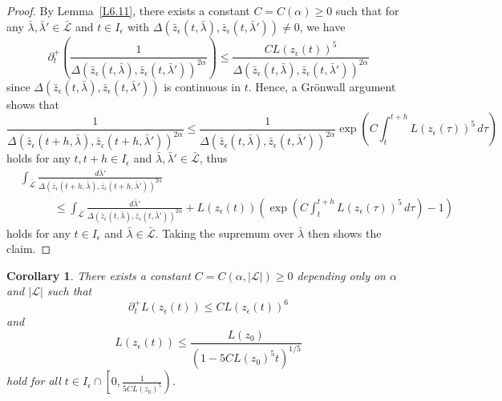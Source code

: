\documentclass[reqno,centertags,12pt]{amsart}
\newtheorem{corollary}[theorem]{Corollary}
\theoremstyle{definition}
\numberwithin{equation}{section}
\newcommand{\abs}[1]{\left\lvert#1\right\rvert}
\begin{document}
\begin{proof}
    By Lemma~\ref{L6.11}, there exists a constant
    $C=C(\alpha)\geq 0$ such that for any
    $\bar{\lambda},\bar{\lambda}'\in\bar{\mathcal{L}}$ and $t\in I_{\epsilon}$ with
    $\Delta(\bar{z}_{\epsilon}(t,\bar{\lambda}), \bar{z}_{\epsilon}(t,\bar{\lambda}'))\neq 0$,
    we have
    \[
        \partial_{t}^{+}\left(\frac{1}
        {\Delta(\bar{z}_{\epsilon}(t,\bar{\lambda}),
        \bar{z}_{\epsilon}(t,\bar{\lambda}'))^{2\alpha}}
        \right)
        \leq \frac{CL(z_{\epsilon}(t))^{5}}
        {\Delta(\bar{z}_{\epsilon}(t,\bar{\lambda}),
        \bar{z}_{\epsilon}(t,\bar{\lambda}'))^{2\alpha}}
    \]
    since $\Delta(\bar{z}_{\epsilon}(t,\bar{\lambda}), \bar{z}_{\epsilon}(t,\bar{\lambda}'))$
    is continuous in $t$. Hence, a Gr\"{o}nwall argument shows that
    \[
        \frac{1}
        {\Delta(\bar{z}_{\epsilon}(t+h,\bar{\lambda}),
        \bar{z}_{\epsilon}(t+h,\bar{\lambda}'))^{2\alpha}}
        \leq
        \frac{1}
        {\Delta(\bar{z}_{\epsilon}(t,\bar{\lambda}),
        \bar{z}_{\epsilon}(t,\bar{\lambda}'))^{2\alpha}}
        \exp\left(
            C\int_{t}^{t+h}
            L(z_{\epsilon}(\tau))^{5}\,d\tau
        \right)
    \]
    holds for any $t,t+h\in I_{\epsilon}$ and
    $\bar{\lambda},\bar{\lambda}'\in\bar{\mathcal{L}}$, thus
    \begin{align*}
        &\int_{\bar{\mathcal{L}}}
        \frac{d\bar{\lambda}'}
        {\Delta(\bar{z}_{\epsilon}(t+h,\bar{\lambda}),
        \bar{z}_{\epsilon}(t+h,\bar{\lambda}'))^{2\alpha}} \\
        &\quad\quad\quad \leq
        \int_{\bar{\mathcal{L}}}
        \frac{d\bar{\lambda}'}
        {\Delta(\bar{z}_{\epsilon}(t,\bar{\lambda}),
        \bar{z}_{\epsilon}(t,\bar{\lambda}'))^{2\alpha}}
        + L(z_{\epsilon}(t))
        \left(
            \exp\left(
                C\int_{t}^{t+h}
                L(z_{\epsilon}(\tau))^{5}\,d\tau
            \right) - 1
        \right)
    \end{align*}
    holds for any $t\in I_{\epsilon}$ and $\bar{\lambda}\in\bar{\mathcal{L}}$.
    Taking the supremum over $\bar{\lambda}$ then shows the claim.
\end{proof}

\begin{corollary}\label{C6.13}
    There exists a constant $C=C(\alpha,\abs{\mathcal{L}})\geq 0$ depending only on
    $\alpha$ and $\abs{\mathcal{L}}$ such that
    \begin{equation}\label{6.5}
        \partial_{t}^{+}L(z_{\epsilon}(t))
        \leq CL(z_{\epsilon}(t))^{6}
    \end{equation}
    and
    \begin{equation}\label{6.6}
        L(z_{\epsilon}(t))
        \leq \frac{L(z_{0})}{(1 - 5CL(z_{0})^{5}t)^{1/5}}
    \end{equation}
    hold for all $t\in I_{\epsilon}\cap \left[0, \frac{1}{5CL(z_{0})^{5}}\right)$.
\end{corollary}
\end{document}

